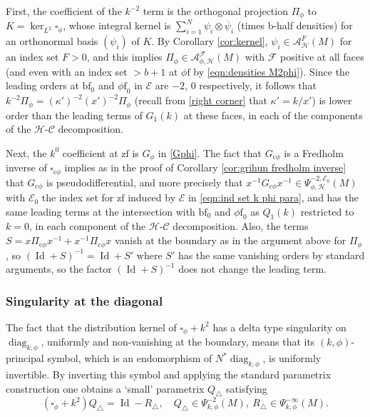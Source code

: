 \documentclass[JEP,XML,SOM,Unicode,NoFloatCountersInSection,published]{cedram}
\newcommand{\cphi}{{\mathrm{c}\phi}}
\theoremstyle{plain}
\theoremstyle{definition}
\newcommand\calA{{\mathcal A}}
\newcommand\calE{{\mathcal E}}
\newcommand\calF{{\mathcal F}}
\newcommand{\phif}{{\phi\mathrm{f}}}
\newcommand{\bbf}{{\mathrm{bf}}}
\newcommand{\zf}{{\mathrm{zf}}}
\DeclareMathOperator\diag{diag}
\DeclareMathOperator{\Id}{Id}
\begin{document}
First,
the coefficient of the $k^{-2}$ term is the orthogonal projection $\Pi_\phi$ to $K=\ker_{L^2}\square_\phi$, whose integral kernel is $\sum_{i=1}^N \psi_i \otimes\overline\psi_i$ (times b-half densities) for an orthonormal basis $(\psi_i)$ of $K$. By Corollary \ref{cor:kernel}, $\psi_i\in \calA^F_{\mathscr{H}}(M)$ for an index set $F>0$, and this implies
$\Pi_\phi\in\calA^\calF_{\phi,\mathscr{H}}(M)$ with $\calF$ positive at all faces (and even with an index set $>b+1$ at $\phif$ by \eqref{eqn:densities M2phi}). Since the leading orders at $\bbf_0$ and $\phif_0$ in $\calE$ are $-2$, $0$ respectively, it follows that $k^{-2}\Pi_\phi=(\kappa')^{-2}(x')^{-2}\Pi_\phi$ (recall from \eqref{right corner} that $\kappa'= k/x'$) is lower order than the leading terms of $G_1(k)$ at these faces, in each of the components of the $\mathscr{H}$-$\mathscr{C}$ decomposition.

Next, the $k^0$ coefficient at $\zf$ is $G_\phi$ in \eqref{Gphi}. The fact that $G_{\cphi}$ is a Fredholm inverse of $\square_{\cphi}$ implies as in the proof of Corollary \ref{cor:grihun fredholm inverse} that $G_{\cphi}$ is pseudodifferential, and more precisely that $x^{-1}G_{\cphi}x^{-1}\in \Psi^{-2,\calE_0}_{\phi, \mathscr{H}}(M)$ with $\calE_0$ the index set for $\zf$ induced by $\calE$ in \eqref{eqn:ind set k phi para}, and has the same leading terms at the intersection with $\bbf_0$ and $\phif_0$ as $Q_1(k)$ restricted to $k=0$, in each component of the $\mathscr{H}$-$\mathscr{C}$ decomposition.
Also, the terms $S=x \Pi_{\cphi} x^{-1} + x^{-1} \Pi_{\cphi} x$ vanish at the boundary as in the argument above for $\Pi_\phi$, so $(\Id+S)^{-1}=\Id+S'$ where $S'$ has the same vanishing orders by standard arguments, so the factor $(\Id+S)^{-1}$ does not change the leading term.

\subsubsection{Singularity at the diagonal}
The fact that the distribution kernel of $\square_\phi+k^2$ has a delta type singularity on $\diag_{k,\phi}$, uniformly and non-vanishing at the boundary, means that its $(k,\phi)$-principal symbol, which is an endomorphism of $N^*\diag_{k,\phi}$, is uniformly invertible. By inverting this symbol and applying the standard parametrix construction one obtains a `small' parametrix $Q_\triangle$ satisfying
\[
(\square_\phi+k^2)Q_\triangle = \Id - R_\triangle,\quad
Q_{\triangle}\in \Psi_{k,\phi}^{-2}(M),\
R_{\triangle}\in \Psi_{k,\phi}^{-\infty}(M).
\]
\end{document}
